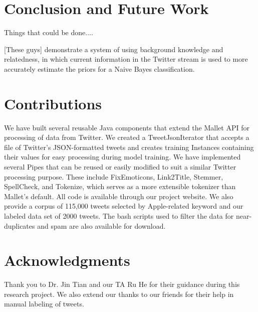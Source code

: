 \documentclass[letterpaper]{article}
\begin{document}
\section{Conclusion and Future Work}

Things that could be done....

[These guys] demonstrate a system of using background knowledge and relatedness, in which current information in the Twitter stream is used to more accurately estimate the priors for a Naive Bayes classification.

\section{Contributions}
We have built several reusable Java components that extend the Mallet API for processing of data from Twitter. We created a TweetJsonIterator that accepts a file of Twitter's JSON-formatted tweets and creates training Instances containing their values for easy processing during model training. We have implemented several Pipes that can be reused or easily modified to suit a similar Twitter processing purpose. These include FixEmoticons, Link2Title, Stemmer, SpellCheck, and Tokenize, which serves as a more extensible tokenizer than Mallet's default. All code is available through our project website. We also provide a corpus of 115,000 tweets selected by Apple-related keyword and our labeled data set of 2000 tweets. The bash scripts used to filter the data for near-duplicates and spam are also available for download.

\section{ Acknowledgments}
Thank you to Dr. Jin Tian and our TA Ru He for their guidance during this research project. We also extend our thanks to our friends for their help in manual labeling of tweets.
\end{document}
